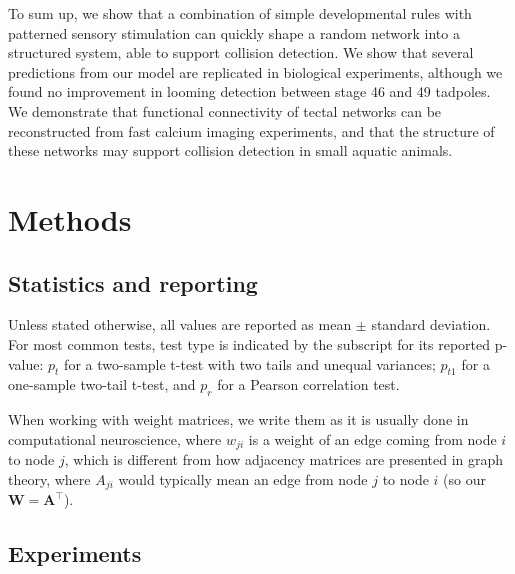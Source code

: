 \documentclass{article}
\begin{document}
To sum up, we show that a combination of simple developmental rules with patterned sensory stimulation can quickly shape a random network into a structured system, able to support collision detection. We show that several predictions from our model are replicated in biological experiments, although we found no improvement in looming detection between stage 46 and 49 tadpoles. We demonstrate that functional connectivity of tectal networks can be reconstructed from fast calcium imaging experiments, and that the structure of these networks may support collision detection in small aquatic animals.

\section*{Methods}


\subsection*{Statistics and reporting}

Unless stated otherwise, all values are reported as mean $\pm$ standard deviation. For most common tests, test type is indicated by the subscript for its reported p-value: $p_t$ for a two-sample t-test with two tails and unequal variances; $p_{t1}$ for a one-sample two-tail t-test, and $p_r$ for a Pearson correlation test.

When working with weight matrices, we write them as it is usually done in computational neuroscience, where $w_{ji}$ is a weight of an edge coming from node $i$ to node $j$, which is different from how adjacency matrices are presented in graph theory, where $A_{ji}$ would typically mean an edge from node $j$ to node $i$ (so our $\mathbf{W} = \mathbf{A}^\top$).

\subsection*{Experiments}
\end{document}
